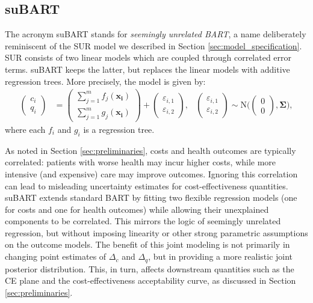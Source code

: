 \documentclass[aoas,preprint]{imsart}
\theoremstyle{plain}
\theoremstyle{definition}
\theoremstyle{remark}
\theoremstyle{remark}
\begin{document}
\subsection{suBART}
The acronym suBART stands for \emph{seemingly unrelated BART}, a name deliberately reminiscent of the SUR model we described in Section \ref{sec:model_specification}. SUR consists of two linear models which are coupled through correlated error terms. suBART keeps the latter, but replaces the linear models with additive regression trees.
More precisely, the model is given by:
 \begin{align*}
\begin{pmatrix}  c_i \\ q_i \end{pmatrix} &= 
\begin{pmatrix}  \sum^m_{j = 1} f_j(\mathbf{x_i})   \\ \sum^m_{j = 1} g_j(\mathbf{x_i}) \end{pmatrix} +
\begin{pmatrix}  \varepsilon_{i,1} \\ \varepsilon_{i,2} \end{pmatrix}, 
& \begin{pmatrix}  \varepsilon_{i,1} \\ \varepsilon_{i,2} \end{pmatrix} \sim \text{N}\Biggl(\begin{pmatrix}  0 \\ 0 \end{pmatrix}, \boldsymbol{\Sigma} \Biggl),
\end{align*}
where each $f_i$ and $g_i$ is a regression tree.

As noted in Section \ref{sec:preliminaries}, costs and health outcomes are typically correlated: patients with worse health may incur higher costs, while more intensive (and expensive) care may improve outcomes. Ignoring this correlation can lead to misleading uncertainty estimates for cost-effectiveness quantities.
suBART extends standard BART by fitting two flexible regression models (one for costs and one for health outcomes) while allowing their unexplained components to be correlated. This mirrors the logic of seemingly unrelated regression, but without imposing linearity or other strong parametric assumptions on the outcome models.
The benefit of this joint modeling is not primarily in changing point estimates of $\Delta_c$ and $\Delta_q$, but in providing a more realistic joint posterior distribution. This, in turn, affects downstream quantities such as the CE plane and the cost-effectiveness acceptability curve, as discussed in Section \ref{sec:preliminaries}.
\end{document}
